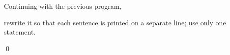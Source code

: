 Continuing with the previous program, 

rewrite it so that each sentence is printed on a separate line; use only one statement.

\qed

